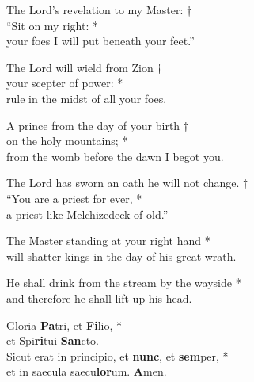 The Lord’s revelation to my Master: †\\
“Sit on my right: *\\
your foes I will put beneath your feet.”

The Lord will wield from Zion †\\
your scepter of power: *\\
rule in the midst of all your foes.

A prince from the day of your birth †\\
on the holy mountains; *\\
from the womb before the dawn I begot you.

The Lord has sworn an oath he will not change. †\\
“You are a priest for ever, *\\
a priest like Melchizedeck of old.”

The Master standing at your right hand *\\
will shatter kings in the day of his great wrath.

He shall drink from the stream by the wayside *\\
and therefore he shall lift up his head.

Gloria \textbf{Pa}tri, et \textbf{Fi}lio, *\\
et Spi\textbf{ri}tui \textbf{San}cto. \\
Sicut erat in principio, et \textbf{nunc}, et \textbf{sem}per, *\\
et in saecula saecu\textbf{lor}um. \textbf{A}men.
